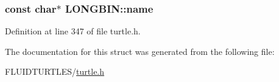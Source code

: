 \hypertarget{struct_l_o_n_g_b_i_n_a1b0aaff196befa968da5362cc00e5ca1}{
\subsubsection[{name}]{\setlength{\rightskip}{0pt plus 5cm}const char$\ast$ L\-O\-N\-G\-B\-I\-N\-::name}}\label{struct_l_o_n_g_b_i_n_a1b0aaff196befa968da5362cc00e5ca1}


Definition at line 347 of file turtle.\-h.



The documentation for this struct was generated from the following file\-:\begin{DoxyCompactItemize}
\item 
F\-L\-U\-I\-D\-T\-U\-R\-T\-L\-E\-S/\hyperlink{turtle_8h}{turtle.\-h}\end{DoxyCompactItemize}
